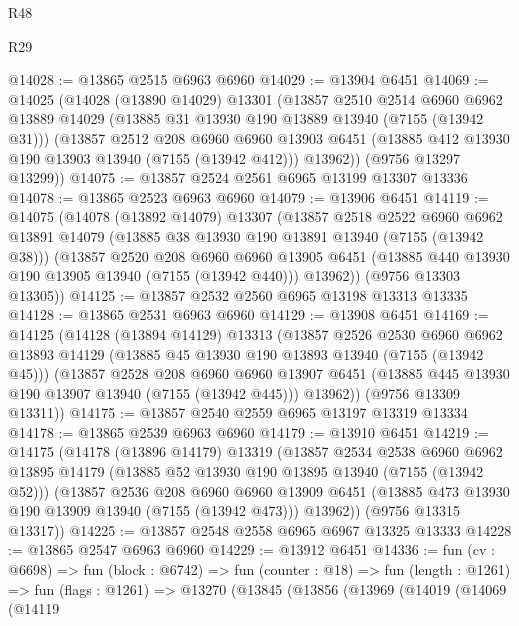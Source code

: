 \begin{lexlean}{R48}
\begin{lexlean}{R29}
\begin{coremodule}
{{{{{{{{{{{{{{{{{{{{{{{{{{{{{{{{{{{{{{{{{{{{{{{{{{{{{{{{{{{{{{{{{{{{{{{{{{{{{{{{{{{{{{{{{{{{{{{{{{{{{{{{{{{{{{{{{{{{{{{{{{{{{{{{{{{{{{{{{{{{{{{{{{{{{{{{{{{{{{{{{{{{{{{{{{{{{{{{{{{{{{{{{{{{{{{{{{{{{{{{{{{{{{{{{{{{{{{{{{@14028 := @13865 @2515 @6963 @6960
@14029 := @13904 @6451
@14069 := @14025
    (@14028
      (@13890 @14029)
      @13301
      (@13857
        @2510
        @2514
        @6960
        @6962
        @13889
        @14029
        (@13885 @31 @13930 @190 @13889 @13940 (@7155 (@13942 @31)))
        (@13857
          @2512
          @208
          @6960
          @6960
          @13903
          @6451
          (@13885 @412 @13930 @190 @13903 @13940 (@7155 (@13942 @412)))
          @13962))
      (@9756 @13297 @13299))
@14075 := @13857 @2524 @2561 @6965 @13199 @13307 @13336
@14078 := @13865 @2523 @6963 @6960
@14079 := @13906 @6451
@14119 := @14075
    (@14078
      (@13892 @14079)
      @13307
      (@13857
        @2518
        @2522
        @6960
        @6962
        @13891
        @14079
        (@13885 @38 @13930 @190 @13891 @13940 (@7155 (@13942 @38)))
        (@13857
          @2520
          @208
          @6960
          @6960
          @13905
          @6451
          (@13885 @440 @13930 @190 @13905 @13940 (@7155 (@13942 @440)))
          @13962))
      (@9756 @13303 @13305))
@14125 := @13857 @2532 @2560 @6965 @13198 @13313 @13335
@14128 := @13865 @2531 @6963 @6960
@14129 := @13908 @6451
@14169 := @14125
    (@14128
      (@13894 @14129)
      @13313
      (@13857
        @2526
        @2530
        @6960
        @6962
        @13893
        @14129
        (@13885 @45 @13930 @190 @13893 @13940 (@7155 (@13942 @45)))
        (@13857
          @2528
          @208
          @6960
          @6960
          @13907
          @6451
          (@13885 @445 @13930 @190 @13907 @13940 (@7155 (@13942 @445)))
          @13962))
      (@9756 @13309 @13311))
@14175 := @13857 @2540 @2559 @6965 @13197 @13319 @13334
@14178 := @13865 @2539 @6963 @6960
@14179 := @13910 @6451
@14219 := @14175
    (@14178
      (@13896 @14179)
      @13319
      (@13857
        @2534
        @2538
        @6960
        @6962
        @13895
        @14179
        (@13885 @52 @13930 @190 @13895 @13940 (@7155 (@13942 @52)))
        (@13857
          @2536
          @208
          @6960
          @6960
          @13909
          @6451
          (@13885 @473 @13930 @190 @13909 @13940 (@7155 (@13942 @473)))
          @13962))
      (@9756 @13315 @13317))
@14225 := @13857 @2548 @2558 @6965 @6967 @13325 @13333
@14228 := @13865 @2547 @6963 @6960
@14229 := @13912 @6451
@14336 := fun (cv : @6698) =>
  fun (block : @6742) =>
  fun (counter : @18) =>
  fun (length : @1261) =>
  fun (flags : @1261) =>
  @13270
    (@13845
      (@13856
        (@13969
          (@14019
            (@14069
              (@14119
}}}}}}}}}}}}}}}}}}}}}}}}}}}}}}}}}}}}}}}}}}}}}}}}}}}}}}}}}}}}}}}}}}}}}}}}}}}}}}}}}}}}}}}}}}}}}}}}}}}}}}}}}}}}}}}}}}}}}}}}}}}}}}}}}}}}}}}}}}}}}}}}}}}}}}}}}}}}}}}}}}}}}}}}}}}}}}}}}}}}}}}}}}}}}}}}}}}}}}}}}}}}}}}}}}}}}}}}}}
\end{coremodule}
\end{lexlean}
\end{lexlean}
